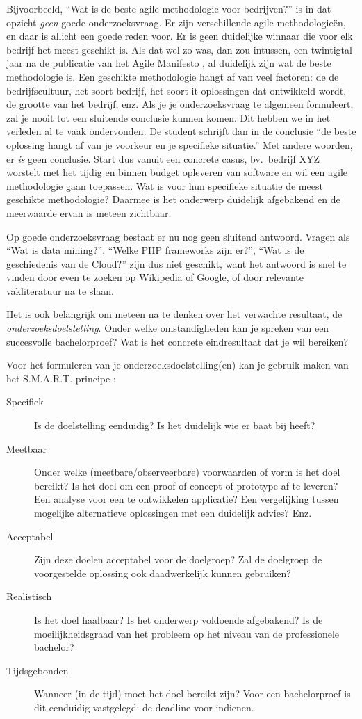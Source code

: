 Bijvoorbeeld, ``Wat is de beste agile methodologie voor bedrijven?'' is in dat opzicht \textit{geen} goede onderzoeksvraag. Er zijn verschillende agile methodologieën, en daar is allicht een goede reden voor. Er is geen duidelijke winnaar die voor elk bedrijf het meest geschikt is. Als dat wel zo was, dan zou intussen, een twintigtal jaar na de publicatie van het Agile Manifesto \autocite{BeckEtAl2001}, al duidelijk zijn wat de beste methodologie is. Een geschikte methodologie hangt af van veel factoren: de de bedrijfscultuur, het soort bedrijf, het soort it-oplossingen dat ontwikkeld wordt, de grootte van het bedrijf, enz. Als je je onderzoeksvraag te algemeen formuleert, zal je nooit tot een sluitende conclusie kunnen komen. Dit hebben we in het verleden al te vaak ondervonden. De student schrijft dan in de conclusie ``de beste oplossing hangt af van je voorkeur en je specifieke situatie.'' Met andere woorden, er \textit{is} geen conclusie. Start dus vanuit een concrete casus, bv.\ bedrijf XYZ worstelt met het tijdig en binnen budget opleveren van software en wil een agile methodologie gaan toepassen. Wat is voor hun specifieke situatie de meest geschikte methodologie? Daarmee is het onderwerp duidelijk afgebakend en de meerwaarde ervan is meteen zichtbaar.

Op goede onderzoeksvraag bestaat er nu nog geen sluitend antwoord. Vragen als ``Wat is data mining?'', ``Welke PHP frameworks zijn er?'', ``Wat is de geschiedenis van de Cloud?'' zijn dus niet geschikt, want het antwoord is snel te vinden door even te zoeken op Wikipedia of Google, of door relevante vakliteratuur na te slaan.

Het is ook belangrijk om meteen na te denken over het verwachte resultaat, de \textit{onderzoeksdoelstelling}. Onder welke omstandigheden kan je spreken van een succesvolle bachelorproef? Wat is het concrete eindresultaat dat je wil bereiken?

Voor het formuleren van je onderzoeksdoelstelling(en) kan je gebruik maken van het S.M.A.R.T.-principe \autocite{UchelenJungjohann2003}:

\begin{description}
  \item[Specifiek] Is de doelstelling eenduidig? Is het duidelijk wie er baat bij heeft?
  \item[Meetbaar] Onder welke (meetbare/observeerbare) voorwaarden of vorm is het doel bereikt? Is het doel om een proof-of-concept of prototype af te leveren? Een analyse voor een te ontwikkelen applicatie? Een vergelijking tussen mogelijke alternatieve oplossingen met een duidelijk advies? Enz.
  \item[Acceptabel] Zijn deze doelen acceptabel voor de doelgroep? Zal de doelgroep de voorgestelde oplossing ook daadwerkelijk kunnen gebruiken?
  \item[Realistisch] Is het doel haalbaar? Is het onderwerp voldoende afgebakend? Is de moeilijkheidsgraad van het probleem op het niveau van de professionele bachelor?
  \item[Tijdsgebonden] Wanneer (in de tijd) moet het doel bereikt zijn? Voor een bachelorproef is dit eenduidig vastgelegd: de deadline voor indienen.
\end{description}

